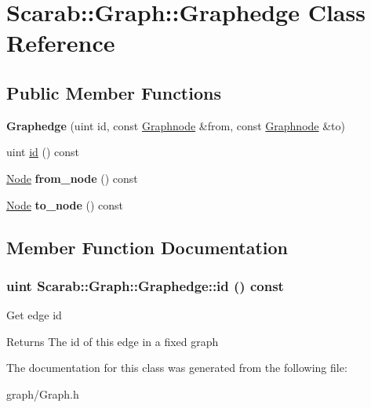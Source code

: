 \hypertarget{classScarab_1_1Graph_1_1Graphedge}{
\section{Scarab::Graph::Graphedge Class Reference}
\label{classScarab_1_1Graph_1_1Graphedge}
}
\subsection*{Public Member Functions}
\begin{DoxyCompactItemize}
\item 
\hypertarget{classScarab_1_1Graph_1_1Graphedge_aea165d2e0b46a46180f5e684df52abdf}{
{\bfseries Graphedge} (uint id, const \hyperlink{classScarab_1_1Graph_1_1Graphnode}{Graphnode} \&from, const \hyperlink{classScarab_1_1Graph_1_1Graphnode}{Graphnode} \&to)}
\label{classScarab_1_1Graph_1_1Graphedge_aea165d2e0b46a46180f5e684df52abdf}

\item 
uint \hyperlink{classScarab_1_1Graph_1_1Graphedge_af4e2b922eb0db014aa6af45ef911e47c}{id} () const 
\item 
\hypertarget{classScarab_1_1Graph_1_1Graphedge_a10760ab9034b358f9bd4aa28c44117d5}{
\hyperlink{classScarab_1_1Graph_1_1Graphnode}{Node} {\bfseries from\_\-node} () const }
\label{classScarab_1_1Graph_1_1Graphedge_a10760ab9034b358f9bd4aa28c44117d5}

\item 
\hypertarget{classScarab_1_1Graph_1_1Graphedge_ae5b1fccfa8a11847b8be2a27690243f0}{
\hyperlink{classScarab_1_1Graph_1_1Graphnode}{Node} {\bfseries to\_\-node} () const }
\label{classScarab_1_1Graph_1_1Graphedge_ae5b1fccfa8a11847b8be2a27690243f0}

\end{DoxyCompactItemize}


\subsection{Member Function Documentation}
\hypertarget{classScarab_1_1Graph_1_1Graphedge_af4e2b922eb0db014aa6af45ef911e47c}{
\subsubsection[{id}]{\setlength{\rightskip}{0pt plus 5cm}uint Scarab::Graph::Graphedge::id () const}}
\label{classScarab_1_1Graph_1_1Graphedge_af4e2b922eb0db014aa6af45ef911e47c}
Get edge id

\begin{DoxyReturn}{Returns}
The id of this edge in a fixed graph 
\end{DoxyReturn}


The documentation for this class was generated from the following file:\begin{DoxyCompactItemize}
\item 
graph/Graph.h\end{DoxyCompactItemize}
